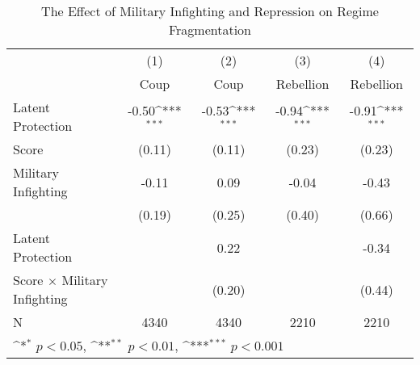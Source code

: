 \begin{table}[htbp]\centering
\def\sym#1{\ifmmode^{#1}\else\(^{#1}\)\fi}
\caption{\label{tab3} The Effect of Military Infighting and Repression on Regime Fragmentation}
\begin{tabular}{l*{4}{c}}
\hline\hline
                    &\multicolumn{1}{c}{(1)}         &\multicolumn{1}{c}{(2)}         &\multicolumn{1}{c}{(3)}         &\multicolumn{1}{c}{(4)}         \\
                    &        Coup         &        Coup         &   Rebellion         &   Rebellion         \\
\hline
Latent Protection   &       -0.50\sym{***}&       -0.53\sym{***}&       -0.94\sym{***}&       -0.91\sym{***}\\
Score               &      (0.11)         &      (0.11)         &      (0.23)         &      (0.23)         \\
Military Infighting &       -0.11         &        0.09         &       -0.04         &       -0.43         \\
                    &      (0.19)         &      (0.25)         &      (0.40)         &      (0.66)         \\
Latent Protection   &                     &        0.22         &                     &       -0.34         \\
Score $\times$ Military Infighting&                     &      (0.20)         &                     &      (0.44)         \\
\hline
N                   &        4340         &        4340         &        2210         &        2210         \\
\hline\hline
\multicolumn{5}{l}{\footnotesize \sym{*} \(p<0.05\), \sym{**} \(p<0.01\), \sym{***} \(p<0.001\)}\\
\end{tabular}
\end{table}

